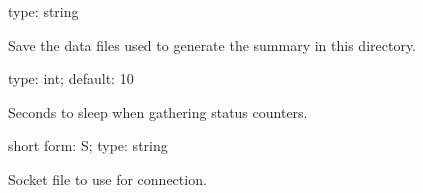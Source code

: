 \documentclass[letterpaper,10pt,english]{sphinxmanual}
\begin{document}
\begin{fulllineitems}
\label{\detokenize{mariadb-database-summary:cmdoption-mariadb-database-summary-save-samples}}
\sphinxAtStartPar
type: string

\sphinxAtStartPar
Save the data files used to generate the summary in this directory.

\end{fulllineitems}


\begin{fulllineitems}
\label{\detokenize{mariadb-database-summary:cmdoption-mariadb-database-summary-sleep}}
\sphinxAtStartPar
type: int; default: 10

\sphinxAtStartPar
Seconds to sleep when gathering status counters.

\end{fulllineitems}


\begin{fulllineitems}
\label{\detokenize{mariadb-database-summary:cmdoption-mariadb-database-summary-socket}}
\sphinxAtStartPar
short form: \sphinxhyphen{}S; type: string

\sphinxAtStartPar
Socket file to use for connection.

\end{fulllineitems}
\end{document}

